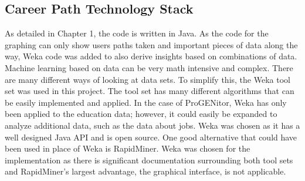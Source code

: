 \subsection{Career Path Technology Stack}
As detailed in Chapter 1, the code is written in Java.  As the code for the
graphing can only show users paths taken and important pieces of data along the
way, Weka code was added to also derive insights based on combinations of data. 
Machine learning based on data can be very math intensive and complex.  There
are many different ways of looking at data sets.  To simplify this, the Weka
tool set was used in this project.  The tool set has many different algorithms
that can be easily implemented and applied.  In the case of ProGENitor, Weka has
only been applied to the education data; however, it could easily be
expanded to analyze additional data, such as the data about jobs.  Weka was
chosen as it has a well designed Java API and is open source.  One good
alternative that could have been used in place of Weka is RapidMiner.  Weka was
chosen for the implementation as there is significant documentation surrounding
both tool sets and RapidMiner's largest advantage, the graphical interface, is
not applicable.
